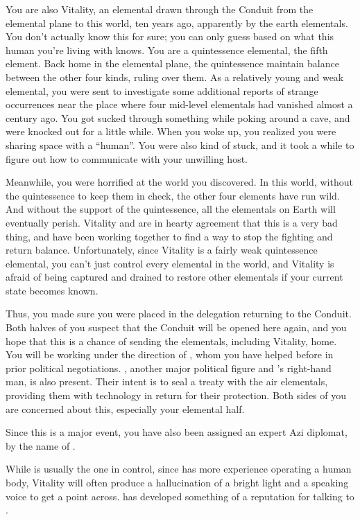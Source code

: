 \documentclass[char]{elementals}
\begin{document}
You are also Vitality, an elemental drawn through the Conduit from the elemental plane to this world, ten years ago, apparently by the earth elementals.  You don't actually know this for sure; you can only guess based on what this human you're living with knows.  You are a quintessence elemental, the fifth element.  Back home in the elemental plane, the quintessence maintain balance between the other four kinds, ruling over them.  As a relatively young and weak elemental, you were sent to investigate some additional reports of strange occurrences near the place where four mid-level elementals had vanished almost a century ago.  You got sucked through something while poking around a cave, and were knocked out for a little while.  When you woke up, you realized you were sharing space with a ``human''.  You were also kind of stuck, and it took a while to figure out how to communicate with your unwilling host.

Meanwhile, you were horrified at the world you discovered.  In this world, without the quintessence to keep them in check, the other four elements have run wild.  And without the support of the quintessence, all the elementals on Earth will eventually perish.  Vitality and \cAvatar{} are in hearty agreement that this is a very bad thing, and have been working together to find a way to stop the fighting and return balance.  Unfortunately, since Vitality is a fairly weak quintessence elemental, you can't just control every elemental in the world, and Vitality is afraid of being captured and drained to restore other elementals if your current state becomes known.

Thus, you made sure you were placed in the delegation returning to the Conduit.  Both halves of you suspect that the Conduit will be opened here again, and you hope that this is a chance of sending the elementals, including Vitality, home.  You will be working under the direction of \cLeader{}, whom you have helped before in prior political negotiations.  \cDema{}, another major political figure and \cLeader{}'s right-hand man, is also present.  Their intent is to seal a treaty with the air elementals, providing them with technology in return for their protection.  Both sides of you are concerned about this, especially your elemental half.  

Since this is a major event, you have also been assigned an expert Azi diplomat, by the name of \cDiplomat{}.  

While \cAvatar{} is usually the one in control, since \cAvatar{\they} has more experience operating a human body, Vitality will often produce a hallucination of a bright light and a speaking voice to get a point across.  \cAvatar{} has developed something of a reputation for talking to .
\end{document}
